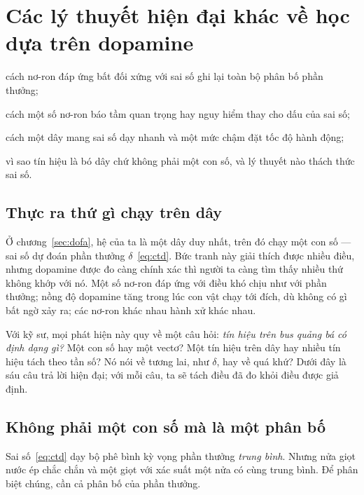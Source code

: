 \chapter{Các lý thuyết hiện đại khác về học dựa trên dopamine}
\label{sec:dofaalt}
\begin{chaptergoals}
\item cách nơ-ron  đáp ứng bất đối xứng với sai số ghi lại toàn bộ phân bố phần thưởng;
\item cách một số nơ-ron  báo tầm quan trọng hay nguy hiểm thay cho dấu của sai số;
\item cách một dây mang sai số dạy nhanh và một mức chậm đặt tốc độ hành động;
\item vì sao tín hiệu  là bó dây chứ không phải một con số, và lý thuyết nào thách thức sai số.
\end{chaptergoals}

\section{Thực ra thứ gì chạy trên dây}

Ở chương~\ref{sec:dofa}, hệ  của ta là một dây duy nhất, trên đó chạy một con số --- sai số dự đoán phần thưởng $\delta$~\eqref{eq:ctd}. Bức tranh này giải thích được nhiều điều, nhưng dopamine được đo càng chính xác thì người ta càng tìm thấy nhiều thứ không khớp với nó. Một số nơ-ron đáp ứng với điều khó chịu như với phần thưởng; nồng độ dopamine tăng trong lúc con vật chạy tới đích, dù không có gì bất ngờ xảy ra; các nơ-ron  khác nhau hành xử khác nhau.

Với kỹ sư, mọi phát hiện này quy về một câu hỏi: \emph{tín hiệu trên bus quảng bá có định dạng gì?} Một con số hay một vectơ? Một tín hiệu trên dây hay nhiều tín hiệu tách theo tần số? Nó nói về tương lai, như $\delta$, hay về quá khứ? Dưới đây là sáu câu trả lời hiện đại; với mỗi câu, ta sẽ tách điều đã đo khỏi điều được giả định.

\section{Không phải một con số mà là một phân bố}

Sai số~\eqref{eq:ctd} dạy bộ phê bình kỳ vọng phần thưởng \emph{trung bình}. Nhưng nửa giọt nước ép chắc chắn và một giọt với xác suất một nửa có cùng trung bình. Để phân biệt chúng, cần cả phân bố của phần thưởng.

